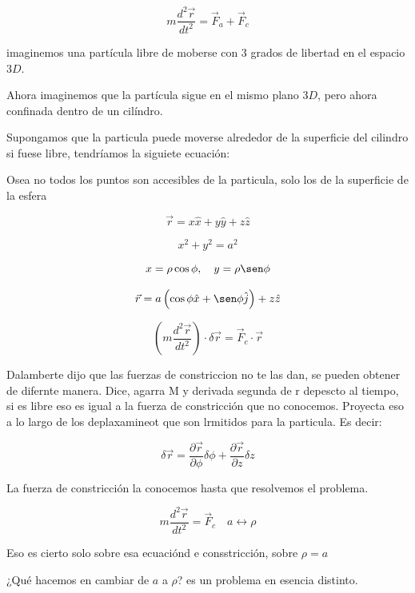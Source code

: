 \documentclass{article}
\begin{document}
\[ m \frac{  d^{2}\vec{r} }{dt^{2}} = \vec{F}_{a} + \vec{F}_{c} \]

imaginemos una partícula libre de moberse con 3 grados de libertad en el espacio $3D$.


Ahora imaginemos que la partícula sigue en el mismo plano $3D$, pero ahora confinada dentro de un cilíndro.


Supongamos que la particula puede moverse alrededor de la superficie del cilindro si fuese libre, tendríamos la siguiete ecuación:

Osea no todos los puntos son accesibles de la particula, solo los de la superficie de la esfera

\[ \vec{r} = x\hat{x} + y\hat{y} + z\hat{z}   \]

\[ \boxed{x^{2} + y^{2} = a^{2}}   \] 

\[ x=\rho \cos \phi, \quad y=\rho\sen\phi  \]

\[ \vec{r} = a \left( \cos\phi \hat{x} + \sen\phi\hat{j}   \right) + z\hat{z}   \]


\[  \boxed{ \left( m \frac{d^{2} \vec{r}}{dt^{2}}  \right) \cdot \delta{\vec{r}} = \vec{F}_{c} \cdot \vec{r}    } \]



Dalamberte dijo que las fuerzas de constriccion no te las dan, se pueden obtener de difernte manera. Dice, agarra M y derivada segunda de r depescto al tiempo, si es libre eso es igual a la fuerza de constricción que no conocemos. Proyecta eso a lo largo de los deplaxamineot que son lrmitidos para la particula. Es decir:





\[ \delta{\vec{r}}  = \frac{ \partial \vec{r}}{\partial \phi} \delta{\phi} + \frac{ \partial \vec{r}  }{\partial z} \delta{z}\]

La fuerza de constricción la conocemos hasta que resolvemos el problema.


\[ \boxed{m \frac{d^{2} \vec{r} }{ dt^{2}  } = \vec{F}_{c}  } \quad a \longleftrightarrow \rho  \]

Eso es cierto solo sobre esa ecuaciónd e consstricción, sobre $\rho=a$

¿Qué hacemos en cambiar de $a$ a $\rho$? es un problema en esencia distinto.
\end{document}
